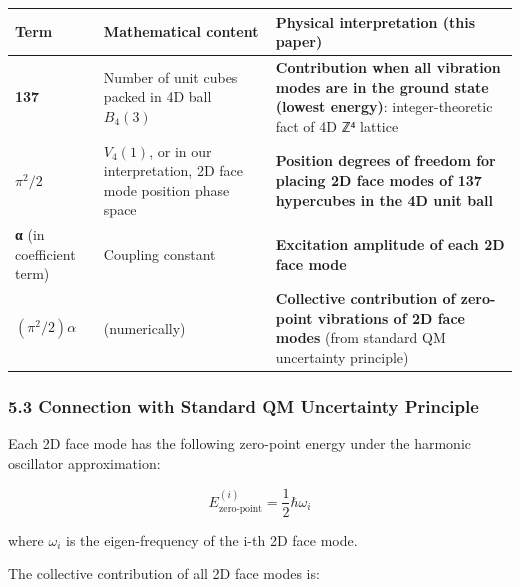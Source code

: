 \documentclass[
  11pt]{article}
\newcounter{none} %
\begin{document}
{\def\LTcaptype{none} %
\begin{longtable}[]{@{}
  >{\raggedright\arraybackslash}p{}
  >{\raggedright\arraybackslash}p{}
  >{\raggedright\arraybackslash}p{}@{}}
\toprule\noalign{}
\begin{minipage}[b]{\linewidth}\raggedright
Term
\end{minipage} & \begin{minipage}[b]{\linewidth}\raggedright
Mathematical content
\end{minipage} & \begin{minipage}[b]{\linewidth}\raggedright
Physical interpretation (this paper)
\end{minipage} \\
\midrule\noalign{}
\endhead
\bottomrule\noalign{}
\endlastfoot
\textbf{137} & Number of unit cubes packed in 4D ball \(B_4(3)\) &
\textbf{Contribution when all vibration modes are in the ground state
(lowest energy)}: integer-theoretic fact of 4D ℤ⁴ lattice \\
\textbf{\(\pi^2/2\)} & \(V_4(1)\), or in our interpretation, 2D face
mode position phase space & \textbf{Position degrees of freedom for
placing 2D face modes of 137 hypercubes in the 4D unit ball} \\
\textbf{α} (in coefficient term) & Coupling constant &
\textbf{Excitation amplitude of each 2D face mode} \\
\textbf{\((\pi^2/2)\alpha\)} & 0.036 (numerically) & \textbf{Collective
contribution of zero-point vibrations of 2D face modes} (from standard
QM uncertainty principle) \\
\end{longtable}
}

\subsubsection{5.3 Connection with Standard QM Uncertainty
Principle}\label{connection-with-standard-qm-uncertainty-principle}

Each 2D face mode has the following zero-point energy under the harmonic
oscillator approximation:

\[E_{\text{zero-point}}^{(i)} = \frac{1}{2}\hbar\omega_i\]

where \(\omega_i\) is the eigen-frequency of the i-th 2D face mode.

The collective contribution of all 2D face modes is:
\end{document}
